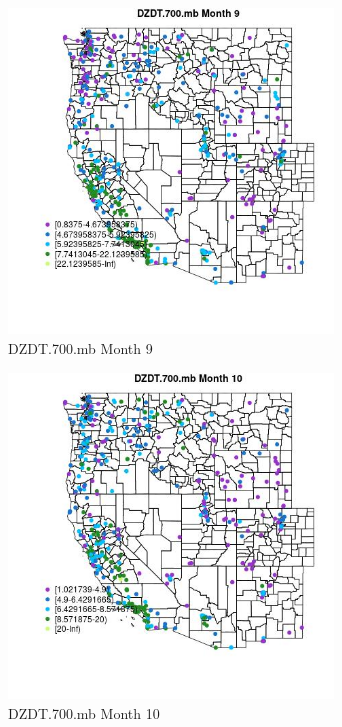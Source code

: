 \begin{figure} 
\centering  
\includegraphics[width=0.77\textwidth]{Code_Outputs/ML_input_report_ML_input_PM25_Step5_part_d_de_duplicated_aves_ML_input_MapObsMo9DZDT700mb.jpg} 
\caption{\label{fig:ML_input_report_ML_input_PM25_Step5_part_d_de_duplicated_aves_ML_inputMapObsMo9DZDT700mb}DZDT.700.mb Month 9} 
\end{figure} 
 

\begin{figure} 
\centering  
\includegraphics[width=0.77\textwidth]{Code_Outputs/ML_input_report_ML_input_PM25_Step5_part_d_de_duplicated_aves_ML_input_MapObsMo10DZDT700mb.jpg} 
\caption{\label{fig:ML_input_report_ML_input_PM25_Step5_part_d_de_duplicated_aves_ML_inputMapObsMo10DZDT700mb}DZDT.700.mb Month 10} 
\end{figure} 
 

